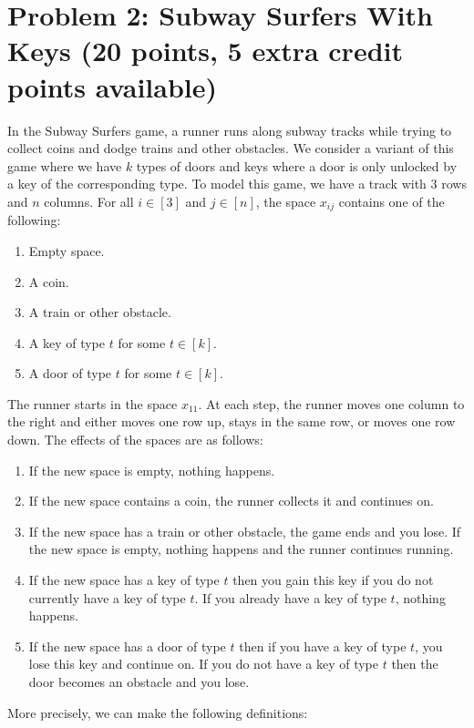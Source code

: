 \documentclass[12pt]{article}
\begin{document}
\section*{Problem 2: Subway Surfers With Keys (20 points, 5 extra credit points available)}
In the Subway Surfers game, a runner runs along subway tracks while trying to collect coins and dodge trains and other obstacles. We consider a variant of this game where we have $k$ types of doors and keys where a door is only unlocked by a key of the corresponding type. To model this game, we have a track with $3$ rows and $n$ columns. For all $i \in [3]$ and $j \in [n]$, the space $x_{ij}$ contains one of the following:
\begin{enumerate}
\item Empty space.
\item A coin.
\item A train or other obstacle.
\item A key of type $t$ for some $t \in [k]$.
\item A door of type $t$ for some $t \in [k]$.
\end{enumerate}
The runner starts in the space $x_{11}$. At each step, the runner moves one column to the right and either moves one row up, stays in the same row, or moves one row down. The effects of the spaces are as follows:
\begin{enumerate}
\item If the new space is empty, nothing happens.
\item If the new space contains a coin, the runner collects it and continues on. 
\item If the new space has a train or other obstacle, the game ends and you lose. If the new space is empty, nothing happens and the runner continues running.
\item If the new space has a key of type $t$ then you gain this key if you do not currently have a key of type $t$. If you already have a key of type $t$, nothing happens.
\item If the new space has a door of type $t$ then if you have a key of type $t$, you lose this key and continue on. If you do not have a key of type $t$ then the door becomes an obstacle and you lose.
\end{enumerate}
More precisely, we can make the following definitions:
\end{document}
